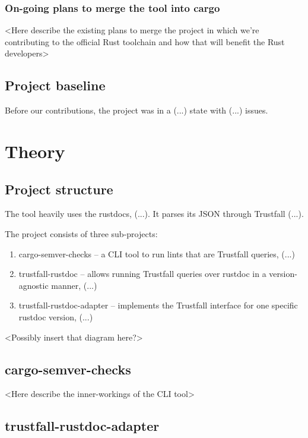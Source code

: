 \documentclass[licencjacka,en]{pracamgr}
\begin{document}
\subsection{On-going plans to merge the tool into cargo}

<Here describe the existing plans to merge the project in which we're contributing
to the official Rust toolchain and how that will benefit the Rust developers>


\section{Project baseline}

Before our contributions, the project was in a (...) state
with (...) issues.



\chapter{Theory}\label{r:theory}

\section{Project structure}\label{r:projectstructure}

The tool heavily uses the rustdocs, (...).
It parses its JSON through Trustfall (...).

The project consists of three sub-projects:
\begin{enumerate}
	\item cargo-semver-checks -- a CLI tool to run lints that are Trustfall queries, (...)
	\item trustfall-rustdoc -- allows running Trustfall queries over rustdoc in a version-agnostic manner, (...)
	\item trustfall-rustdoc-adapter -- implements the Trustfall interface for one specific rustdoc version, (...)
\end{enumerate}

<Possibly insert that diagram here?>


\section{cargo-semver-checks}

<Here describe the inner-workings of the CLI tool>


\section{trustfall-rustdoc-adapter}
\end{document}
